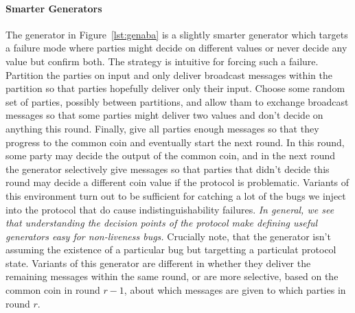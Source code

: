 \begin{figure*}

\caption{The code for the the most basic ``smart'' generator we use for checking ABA. We exclude print statements and the environment setup code that is common to all generators.}
\label{lst:genaba}
\end{figure*}

\paragraph{Smarter Generators}
The generator in Figure~\ref{lst:genaba} is a slightly smarter generator which targets a failure mode where parties might decide on different values or never decide any value but confirm both.
The strategy is intuitive for forcing such a failure.
Partition the parties on input and only deliver broadcast messages within the partition so that parties hopefully deliver only their input.
Choose some random set of parties, possibly between partitions, and allow tham to exchange broadcast messages so that some parties might deliver two values and don't decide on anything this round.
Finally, give all parties enough  messages so that they progress to the common coin and eventually start the next round.
In this round, some party may decide the output of the common coin, and in the next round the generator selectively give messages so that parties that didn't decide this round may decide a different coin value if the protocol is problematic.
Variants of this environment turn out to be sufficient for catching a lot of the bugs we inject into the protocol that do cause indistinguishability failures. 
\emph{In general, we see that understanding the decision points of the protocol make defining useful generators easy for non-liveness bugs.}
Crucially note, that the generator isn't assuming the existence of a particular bug but targetting a particulat protocol state.
Variants of this generator are different in whether they deliver the remaining  messages within the same round, or are more selective, based on the common coin in round $r-1$, about which messages are given to which parties in round $r$.


